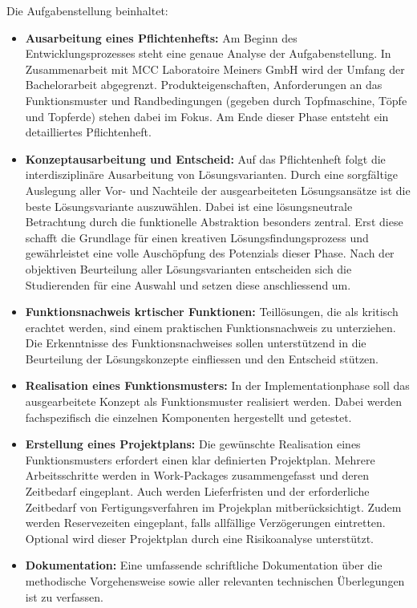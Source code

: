 Die Aufgabenstellung beinhaltet:
\begin{itemize}
	\item \textbf{Ausarbeitung eines Pflichtenhefts:} Am Beginn des Entwicklungsprozesses steht eine genaue Analyse der Aufgabenstellung. In Zusammenarbeit mit MCC Laboratoire Meiners GmbH wird der Umfang der Bachelorarbeit abgegrenzt. Produkteigenschaften, Anforderungen an das Funktionsmuster und Randbedingungen (gegeben durch Topfmaschine, Töpfe und Topferde) stehen dabei im Fokus. Am Ende dieser Phase entsteht ein detailliertes Pflichtenheft.
	 
	\item \textbf{Konzeptausarbeitung und Entscheid:} Auf das Pflichtenheft folgt die interdisziplinäre Ausarbeitung von Lösungsvarianten. Durch eine sorgfältige Auslegung aller Vor- und Nachteile der ausgearbeiteten Lösungsansätze ist die beste Lösungsvariante auszuwählen. Dabei ist eine lösungsneutrale Betrachtung durch die funktionelle Abstraktion besonders zentral. Erst diese schafft die Grundlage für einen kreativen Lösungsfindungsprozess und gewährleistet eine volle Auschöpfung des Potenzials dieser Phase. Nach der objektiven Beurteilung aller Lösungsvarianten entscheiden sich die Studierenden für eine Auswahl und setzen diese anschliessend um.
	
	\item \textbf{Funktionsnachweis krtischer Funktionen:} Teillösungen, die als kritisch erachtet werden, sind einem praktischen Funktionsnachweis zu unterziehen. Die Erkenntnisse des Funktionsnachweises sollen unterstützend in die Beurteilung der Lösungskonzepte einfliessen und den Entscheid stützen.
	
	\item \textbf{Realisation eines Funktionsmusters:} In der Implementationphase soll das ausgearbeitete Konzept als Funktionsmuster realisiert werden. Dabei werden fachspezifisch die einzelnen Komponenten hergestellt und getestet. 
	
	\item \textbf{Erstellung eines Projektplans:} Die gewünschte Realisation eines Funktionsmusters erfordert einen klar definierten Projektplan. Mehrere Arbeitsschritte werden in Work-Packages zusammengefasst und deren Zeitbedarf eingeplant. Auch  werden Lieferfristen und der erforderliche Zeitbedarf von Fertigungsverfahren im Projekplan mitberücksichtigt. Zudem werden Reservezeiten eingeplant, falls allfällige Verzögerungen eintretten. Optional wird dieser Projektplan durch eine Risikoanalyse unterstützt.
	
	\item \textbf{Dokumentation:} Eine umfassende schriftliche Dokumentation über die methodische Vorgehensweise sowie aller relevanten technischen Überlegungen ist zu verfassen. 
	
\end{itemize}